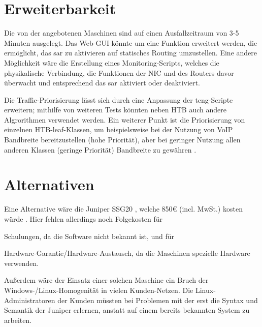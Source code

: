 \section{Erweiterbarkeit}
Die von der {\auftraggeber} angebotenen Maschinen sind auf einen Ausfallzeitraum von 3-5 Minuten ausgelegt. Das Web-GUI könnte um eine Funktion erweitert werden, die ermöglicht, das \gls{sar} zu aktivieren {\bzw}auf statisches Routing umzustellen. Eine andere Möglichkeit wäre die Erstellung eines Monitoring-Scripts, welches die physikalische Verbindung, die Funktionen der \gls{NIC} und des Routers davor überwacht und entsprechend das \gls{sar} aktiviert oder deaktiviert.

Die Traffic-Priorisierung lässt sich durch eine Anpassung der \gls{tcng}-Scripte erweitern; mithilfe von weiteren Tests könnten neben \gls{HTB} auch andere Algrorithmen verwendet werden.
Ein weiterer Punkt ist die Priorisierung von einzelnen \gls{HTB}-leaf-Klassen, um beispielsweise bei der Nutzung von \gls{VoIP} Bandbreite bereitzustellen (hohe Priorität), aber bei geringer Nutzung allen anderen Klassen (geringe Priorität) Bandbreite zu gewähren \citep[Kapitel 7.1.4]{TC}.

\section{Alternativen}
Eine Alternative wäre die Juniper SSG20 \citep{JUNIPER}, welche {\ca}850{\euro} (incl. MwSt.) kosten würde \citep{TLK}. Hier fehlen allerdings noch Folgekosten für
\begin{inparaenum}
  \item Schulungen, da die Software nicht bekannt ist, und für
  \item Hardware-Garantie/Hardware-Austausch, da die Maschinen spezielle Hardware verwenden.
\end{inparaenum}
Außerdem wäre der Einsatz einer solchen Maschine ein Bruch der Windows-/Linux-Homogenität in vielen Kunden-Netzen. Die Linux-Administratoren der Kunden müssten bei Problemen mit der {\auftraggeber} erst die Syntax und Semantik der Juniper erlernen, anstatt auf einem bereits bekannten System zu arbeiten.

